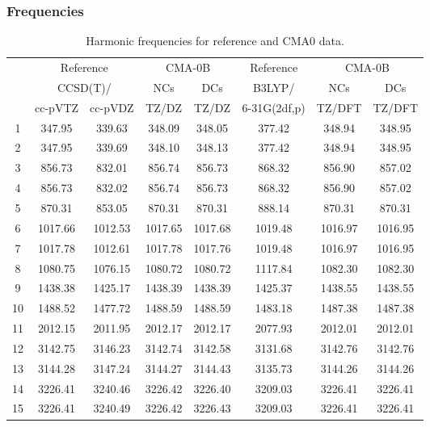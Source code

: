 \documentclass[10pt,oneside]{article}
\begin{document}
\clearpage

\subsubsection*{Frequencies}
\begin{table}[h!]
\centering
\caption{Harmonic frequencies for reference and CMA0 data.}
\begin{tabular}{cccccccc}
\toprule
{} & \multicolumn{2}{c}{Reference} & \multicolumn{2}{c}{CMA-0B} &    Reference & \multicolumn{2}{c}{CMA-0B} \\
{} & \multicolumn{2}{c}{CCSD(T)/} &     NCs &     DCs &       B3LYP/ &     NCs &     DCs \\
{} &   cc-pVTZ & cc-pVDZ &   TZ/DZ &   TZ/DZ & 6-31G(2df,p) &  TZ/DFT &  TZ/DFT \\
\midrule
1  &    347.95 &  339.63 &  348.09 &  348.05 &       377.42 &  348.94 &  348.95 \\
2  &    347.95 &  339.69 &  348.10 &  348.13 &       377.42 &  348.94 &  348.95 \\
3  &    856.73 &  832.01 &  856.74 &  856.73 &       868.32 &  856.90 &  857.02 \\
4  &    856.73 &  832.02 &  856.74 &  856.73 &       868.32 &  856.90 &  857.02 \\
5  &    870.31 &  853.05 &  870.31 &  870.31 &       888.14 &  870.31 &  870.31 \\
6  &   1017.66 & 1012.53 & 1017.65 & 1017.68 &      1019.48 & 1016.97 & 1016.95 \\
7  &   1017.78 & 1012.61 & 1017.78 & 1017.76 &      1019.48 & 1016.97 & 1016.95 \\
8  &   1080.75 & 1076.15 & 1080.72 & 1080.72 &      1117.84 & 1082.30 & 1082.30 \\
9  &   1438.38 & 1425.17 & 1438.39 & 1438.39 &      1425.37 & 1438.55 & 1438.55 \\
10 &   1488.52 & 1477.72 & 1488.59 & 1488.59 &      1483.18 & 1487.38 & 1487.38 \\
11 &   2012.15 & 2011.95 & 2012.17 & 2012.17 &      2077.93 & 2012.01 & 2012.01 \\
12 &   3142.75 & 3146.23 & 3142.74 & 3142.58 &      3131.68 & 3142.76 & 3142.76 \\
13 &   3144.28 & 3147.24 & 3144.27 & 3144.43 &      3135.73 & 3144.26 & 3144.26 \\
14 &   3226.41 & 3240.46 & 3226.42 & 3226.40 &      3209.03 & 3226.41 & 3226.41 \\
15 &   3226.41 & 3240.49 & 3226.42 & 3226.43 &      3209.03 & 3226.41 & 3226.41 \\
\bottomrule
\end{tabular}
\end{table}
\end{document}
